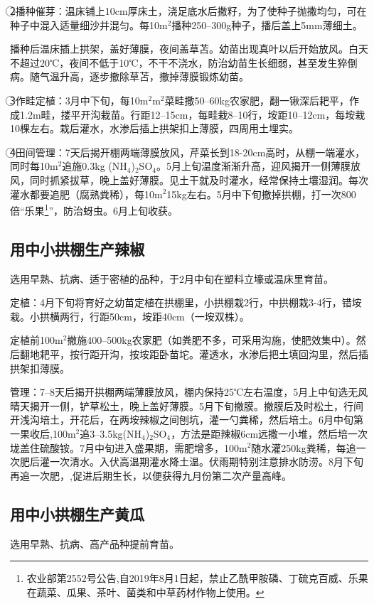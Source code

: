 \documentclass{ctexbook}
\begin{document}
\textcircled{2}播种催芽：温床铺上10cm厚床土，浇足底水后撒籽，为了使种子抛撒均匀，可在种子中混入适量细沙并混匀。每10m$^2$播种250--300g种子，播后盖上5mm薄细土。

播种后温床插上拱架，盖好薄膜，夜间盖草苫。幼苗出现真叶以后开始放风。白天不超过20℃，夜间不低于10℃，不干不浇水，防治幼苗生长细弱，甚至发生猝倒病。随气温升高，逐步撤除草苫，撤掉薄膜锻炼幼苗。

\textcircled{3}作畦定植：3月中下旬，每10m$^2$m$^2$菜畦撒50--60kg农家肥，翻一锹深后耙平，作成1.2m畦，搂平开沟栽苗。行距12--15cm，每畦栽8--10行，垵距10--12cm，每垵栽10棵左右。栽后灌水，水渗后插上拱架扣上薄膜，四周用土埋实。

\textcircled{4}田间管理：7天后揭开棚两端薄膜放风，芹菜长到18-20cm高时，从棚一端灌水，同时每10m$^2$追施0.3kg (NH$_4$)$_2$SO$_4$。5月上旬温度渐渐升高，迎风揭开一侧薄膜放风，同时抓紧拔草，晚上盖好薄膜。见土干就及时灌水，经常保持土壤湿润。每次灌水都要追肥（腐熟粪稀），每10m$^2$15kg左右。5月中下旬撤掉拱棚，打一次800倍“乐果\footnote{农业部第2552号公告,自2019年8月1日起，禁止乙酰甲胺磷、丁硫克百威、乐果在蔬菜、瓜果、茶叶、菌类和中草药材作物上使用。}”，防治蚜虫。6月上旬收获。
\subsection{用中小拱棚生产辣椒}
选用早熟、抗病、适于密植的品种，于2月中旬在塑料立壕或温床里育苗。

定植：4月下旬将育好之幼苗定植在拱棚里，小拱棚栽2行，中拱棚栽3-4行，错垵栽。小拱横两行，行距50cm，垵距40cm（一垵双株）。

定植前100m$^2$撤施400--500kg农家肥（如粪肥不多，可采用沟施，使肥效集中）。然后翻地耙平，按行距开沟，按垵距卧苗坨。灌透水，水渗后把土填回沟里，然后插拱架扣薄膜。

管理：7--8天后揭开拱棚两端薄膜放风，棚内保持25℃左右温度，5月上中旬选无风晴天揭开一侧，铲草松土，晚上盖好薄膜。5月下旬撤膜。撤膜后及时松土，行间开浅沟培土，开花后，在两垵辣椒之间刨坑，灌一勺粪稀，然后培土。6月中旬第一果收后,100m$^2$追3--3.5kg(NH$_4$)$_2$SO$_4$，方法是距辣椒6cm远撒一小堆，然后培一次垅盖住硫酸铵。7月中旬进入盛果期，需肥增多，100m$^2$随水灌250kg粪稀，每追一次肥后灌一次清水。入伏高温期灌水降土温。伏雨期特别注意排水防涝。8月下旬再追一次肥，,促进后期生长，以便获得九月份第二次产量高峰。

\subsection{用中小拱棚生产黄瓜}
选用早熟、抗病、高产品种提前育苗。
\end{document}
